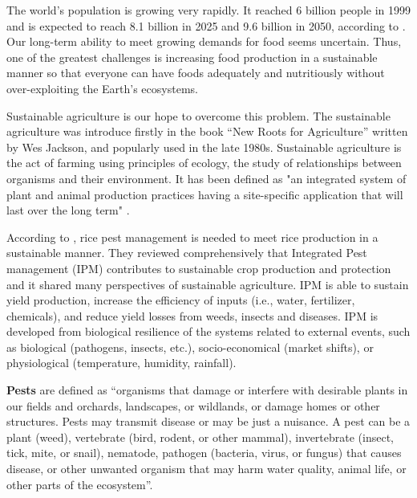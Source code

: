 ﻿%

The world's population is growing very rapidly. It reached 6 billion people in 1999 and is expected to reach  8.1 billion in 2025 and 9.6 billion in 2050, according to \citet{un2013world}. Our long-term ability to meet growing demands for food seems uncertain. Thus, one of the greatest challenges is increasing food production in a sustainable manner so that everyone can have foods adequately and nutritiously without over-exploiting the Earth’s ecosystems.

Sustainable agriculture is our hope to overcome this problem. The sustainable agriculture was introduce firstly in the book ``New Roots for Agriculture'' written by Wes Jackson, and popularly used in the late 1980s. Sustainable agriculture is the act of farming using principles of ecology, the study of relationships between organisms and their environment. It has been defined as "an integrated system of plant and animal production practices having a site-specific application that will last over the long term" \citep{wiki:susagri}.

According to \citet{Savary:2006to}, rice pest management is needed to meet rice production in a sustainable manner. They reviewed comprehensively that Integrated Pest management (IPM) contributes to sustainable crop production and protection and it shared many perspectives of sustainable agriculture. IPM is able to sustain yield production, increase the efficiency of inputs (i.e., water, fertilizer, chemicals), and reduce yield losses from weeds, insects and diseases. IPM is developed from biological resilience of the systems related to external events, such as biological (pathogens, insects, etc.), socio-economical (market shifts), or physiological (temperature, humidity, rainfall). 

\textbf{Pests} are defined as ``organisms that damage or interfere with desirable plants in our fields and orchards, landscapes, or wildlands, or damage homes or other structures. Pests may transmit disease or may be just a nuisance. A pest can be a plant (weed), vertebrate (bird, rodent, or other mammal), invertebrate (insect, tick, mite, or snail), nematode, pathogen (bacteria, virus, or fungus) that causes disease, or other unwanted organism that may harm water quality, animal life, or other parts of the ecosystem''.


